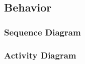 \subsection{Behavior}\label{sc:behavior}

\blindtext %

\subsubsection{Sequence Diagram}\label{ssc:sequencediagram}

\blindtext %

\subsubsection{Activity Diagram}\label{ssc:activitydiagram}

\blindtext %